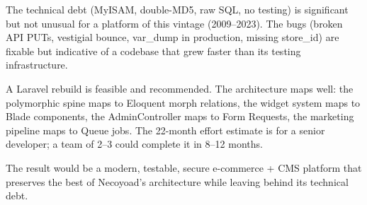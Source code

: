 \documentclass[11pt,a4paper]{article}
\begin{document}
The technical debt (MyISAM, double-MD5, raw SQL, no testing) is
significant but not unusual for a platform of this vintage (2009--2023).
The bugs (broken API PUTs, vestigial bounce, var\_dump in production,
missing store\_id) are fixable but indicative of a codebase that grew
faster than its testing infrastructure.

A Laravel rebuild is feasible and recommended. The architecture maps
well: the polymorphic spine maps to Eloquent morph relations, the
widget system maps to Blade components, the AdminController maps to
Form Requests, the marketing pipeline maps to Queue jobs. The 22-month
effort estimate is for a senior developer; a team of 2--3 could
complete it in 8--12 months.

The result would be a modern, testable, secure e-commerce + CMS
platform that preserves the best of Necoyoad's architecture while
leaving behind its technical debt.
\end{document}
